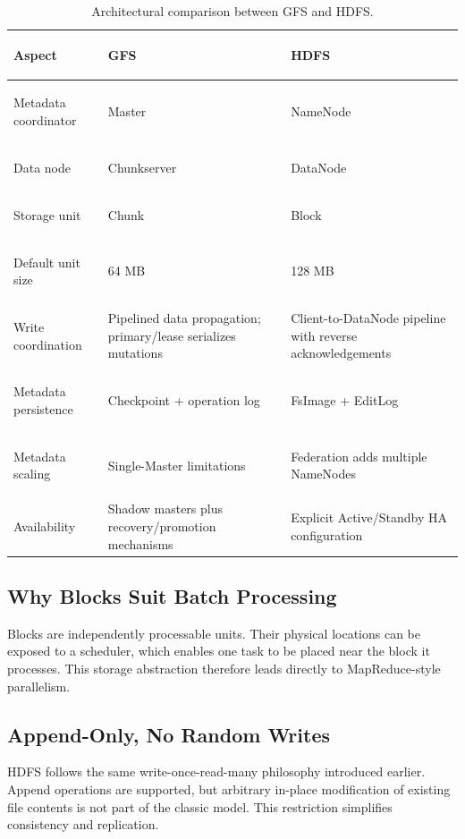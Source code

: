 \documentclass[11pt,a4paper,oneside]{book}
\begin{document}
\begin{table}[htbp]
\centering
\caption{Architectural comparison between GFS and HDFS.}
\label{tab:gfs-hdfs-comparison}
\begin{tabularx}{\textwidth}{>{\bfseries\raggedright\arraybackslash}p{3.1cm} Y Y}
\toprule
{}
Aspect & GFS & HDFS \\
\midrule
Metadata coordinator & Master & NameNode \\
Data node & Chunkserver & DataNode \\
Storage unit & Chunk & Block \\
Default unit size & 64 MB & 128 MB \\
Write coordination & Pipelined data propagation; primary/lease serializes mutations & Client-to-DataNode pipeline with reverse acknowledgements \\
Metadata persistence & Checkpoint + operation log & FsImage + EditLog \\
Metadata scaling & Single-Master limitations & Federation adds multiple NameNodes \\
Availability & Shadow masters plus recovery/promotion mechanisms & Explicit Active/Standby HA configuration \\
\bottomrule
\end{tabularx}
\end{table}

\subsection{Why Blocks Suit Batch Processing}

Blocks are independently processable units. Their physical locations can be exposed to a scheduler, which enables one task to be placed near the block it processes. This storage abstraction therefore leads directly to MapReduce-style parallelism.

\subsection{Append-Only, No Random Writes}

HDFS follows the same write-once-read-many philosophy introduced earlier. Append operations are supported, but arbitrary in-place modification of existing file contents is not part of the classic model. This restriction simplifies consistency and replication.
\end{document}
